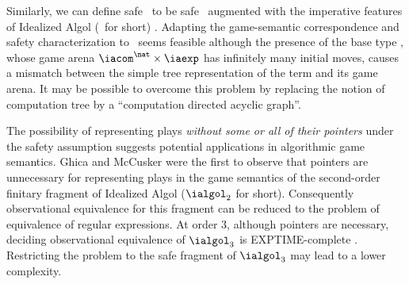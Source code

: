 Similarly, we can define safe \ialgol\ to be safe \pcf\ augmented
with the imperative features of Idealized Algol (\ialgol\ for short)
\cite{Reynolds81}.  Adapting the game-semantic correspondence and
safety characterization to \ialgol\ seems feasible although the
presence of the base type \iavar, whose game arena $\iacom^{\nat}
\times \iaexp$ has infinitely many initial moves, causes a mismatch
between the simple tree representation of the term and its game
arena. It may be possible to overcome this problem by replacing the
notion of computation tree by a ``computation directed acyclic
graph''.

The possibility of representing plays \emph{without some or all of
  their pointers} under the safety assumption suggests potential
applications in algorithmic game semantics. Ghica and McCusker
\cite{ghicamccusker00} were the first to observe that pointers are
unnecessary for representing plays in the game semantics of the
second-order finitary fragment of Idealized Algol ($\ialgol_2$ for
short). Consequently observational equivalence for this fragment can
be reduced to the problem of equivalence of regular expressions.  At
order $3$, although pointers are necessary, deciding observational
equivalence of $\ialgol_3$ is EXPTIME-complete
\cite{DBLP:journals/apal/Ong04,DBLP:conf/fossacs/MurawskiW05}.
Restricting the problem to the safe fragment of $\ialgol_3$ may lead
to a lower complexity.



